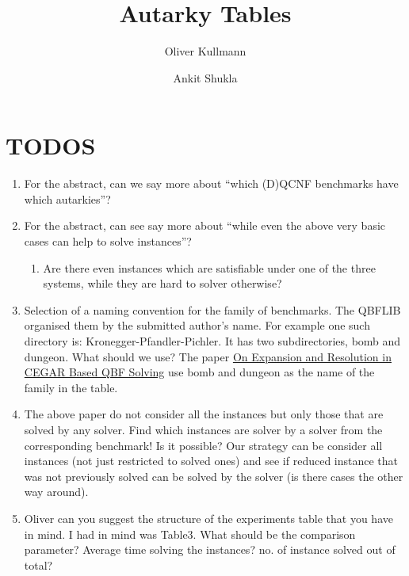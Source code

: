 \documentclass[runningheads]{llncs}
\begin{document}
\title{Autarky Tables}

\author{Oliver Kullmann \and Ankit Shukla}



\maketitle




\setcounter{section}{-1}
\section{TODOS}
\label{sec:todos}

\begin{enumerate}
\item For the abstract, can we say more about ``which (D)QCNF benchmarks have which autarkies''?
\item For the abstract, can see say more about ``while even the above very basic cases can help to solve instances''?
  \begin{enumerate}
  \item Are there even instances which are satisfiable under one of the three systems, while they are hard to solver otherwise?
  \end{enumerate}
 \item Selection of a naming convention for the family of benchmarks. The QBFLIB organised them by the submitted author's name. For example one such directory is: Kronegger-Pfandler-Pichler. It has two subdirectories, bomb and dungeon. What should we use? The paper \href{https://www.react.uni-saarland.de/publications/cav2017-caqe.pdf}{On Expansion and Resolution in CEGAR Based QBF Solving} use bomb and dungeon as the name of the family in the table.
 \item The above paper do not consider all the instances but only those that are solved by any solver. Find which instances are solver by a solver from the corresponding benchmark! Is it possible? Our strategy can be consider all instances (not just restricted to solved ones) and see if reduced instance that was not previously solved can be solved by the solver (is there cases the other way around).
 \item Oliver can you suggest the structure of the experiments table that you have in mind. I had in mind was Table3. What should be the comparison parameter? Average time solving the instances? no. of instance solved out of total?
\end{enumerate}
\end{document}
